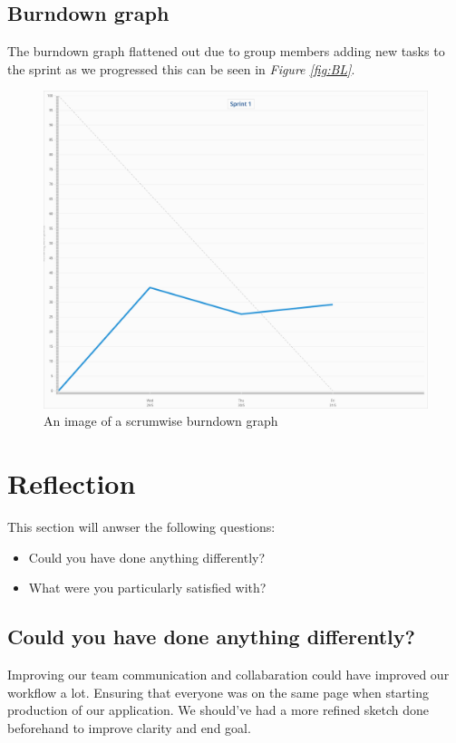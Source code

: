 \documentclass[12pt]{article}
\begin{document}
\subsection{Burndown graph}
The burndown graph flattened out due to group members adding new tasks to the sprint as we progressed this can be seen in
\textit{Figure \ref{fig:BL}}.
\begin{figure}[h]
    \begin{adjustwidth}{-1in}{-1in}
        \centering
        \includegraphics[scale=0.4]{burndown.png}
        \caption{An image of a scrumwise burndown graph}
        \label{fig:BD}
    \end{adjustwidth}
\end{figure}
\clearpage

\section{Reflection}
This section will anwser the following questions:
\begin{itemize}
    \item Could you have done anything differently?
    \item What were you particularly satisfied with?
\end{itemize}

\subsection{Could you have done anything differently?}
Improving our team communication and collabaration could have improved our workflow a lot. Ensuring that everyone was on the 
same page when starting production of our application. We should've had a more refined sketch done beforehand to improve 
clarity and end goal.
\end{document}
